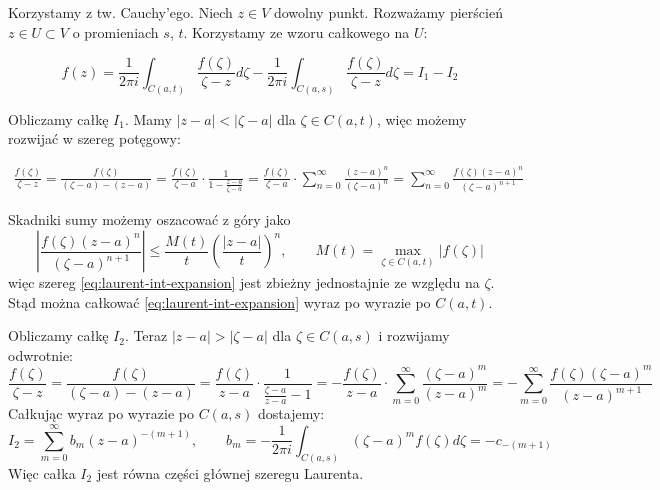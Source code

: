 \documentclass[11pt]{article}
\newcommand{\abs}[1]{\left|#1\right|} %
\theoremstyle{plain}
\theoremstyle{definition}
\theoremstyle{remark}
\let\oldendproof\endproof
\renewenvironment{proof}[1][\proofname]{
  \oldproof[\textsc{\small #1}]
}{\oldendproof}
\begin{document}
\begin{proof}
  Korzystamy z tw. Cauchy'ego.
  Niech $ z \in V $ dowolny punkt.
  Rozważamy pierścień $ z \in U \subset V $ o promieniach $s$, $t$.
  Korzystamy ze wzoru całkowego na $ U $: 

  \begin{adjustbox}{valign=C,raise=0em,minipage={1.0\linewidth}}
  \setlength{\columnsep}{0.5cm}
  \begin{wrapfigure}{r}{3cm}
      \vspace*{-1.5em}
      \resizebox{\linewidth}{!}{}
  \end{wrapfigure}
  \strut{}
    \vspace*{-1em}
  
    $$
      f(z)
      = \frac{1}{2 \pi i} \int_{C(a, t)} \frac{f(\zeta)}{\zeta - z} d\zeta
      - \frac{1}{2 \pi i} \int_{C(a, s)} \frac{f(\zeta)}{\zeta - z} d\zeta
      = I_1 - I_2
    $$

    \vspace*{0.5em}

    Obliczamy całkę $ I_1 $.
    Mamy $ \abs{z-a} < \abs{\zeta - a} $ dla $ \zeta \in C(a, t) $, więc możemy rozwijać w szereg potęgowy:
  
  \end{adjustbox}

  \begin{align*}
    \frac{f(\zeta)}{\zeta - z}
    = \frac{f(\zeta)}{(\zeta - a) - (z - a)}
    = \frac{f(\zeta)}{\zeta - a} \cdot \frac{1}{1 - \frac{z - a}{\zeta - a}} 
    = \frac{f(\zeta)}{\zeta - a} \cdot \sum_{n=0}^{\infty} \frac{(z - a)^n}{(\zeta - a)^n}
    = \sum_{n=0}^{\infty} \frac{f(\zeta)(z - a)^n}{(\zeta - a)^{n+1}}
    \label{eq:laurent-int-expansion} \tag{\small $\spadesuit$}
  \end{align*}

  Skadniki sumy możemy oszacować z góry jako
  $$
    \abs{ \frac{f(\zeta)(z - a)^n}{(\zeta - a)^{n+1}} }
    \leq \frac{M(t)}{t}\left(\frac{\abs{z-a}}{t}\right)^n,
    \qquad
    M(t) = \max_{\zeta \in C(a, t)} \abs{f(\zeta)}
  $$
  więc szereg \eqref{eq:laurent-int-expansion} jest zbieżny jednostajnie ze względu na $ \zeta $.
  Stąd można całkować \eqref{eq:laurent-int-expansion} wyraz po wyrazie po $ C(a, t) $.

  Obliczamy całkę $ I_2 $.
  Teraz $ \abs{z-a} > \abs{\zeta - a} $ dla $ \zeta \in C(a, s) $ i rozwijamy odwrotnie:
  $$
    \frac{f(\zeta)}{\zeta - z}
    = \frac{f(\zeta)}{(\zeta - a) - (z - a)}
    = \frac{f(\zeta)}{z - a} \cdot \frac{1}{\frac{\zeta - a}{z - a} - 1}
    = -\frac{f(\zeta)}{z - a} \cdot \sum_{m=0}^{\infty} \frac{(\zeta - a)^m}{(z - a)^m}
    = -\sum_{m=0}^{\infty} \frac{f(\zeta)(\zeta - a)^m}{(z - a)^{m+1}}
  $$
  Całkując wyraz po wyrazie po $ C(a, s) $ dostajemy:
  $$
    I_2 = 
    \sum_{m=0}^{\infty} b_m(z-a)^{-(m+1)},
    \qquad
    b_m =
    -\frac{1}{2 \pi i} \int_{C(a,s)} (\zeta - a)^{m} f(\zeta) d\zeta
    = -c_{-(m+1)}
  $$
  Więc całka $ I_2 $ jest równa części głównej szeregu Laurenta.
\end{proof}
\end{document}
